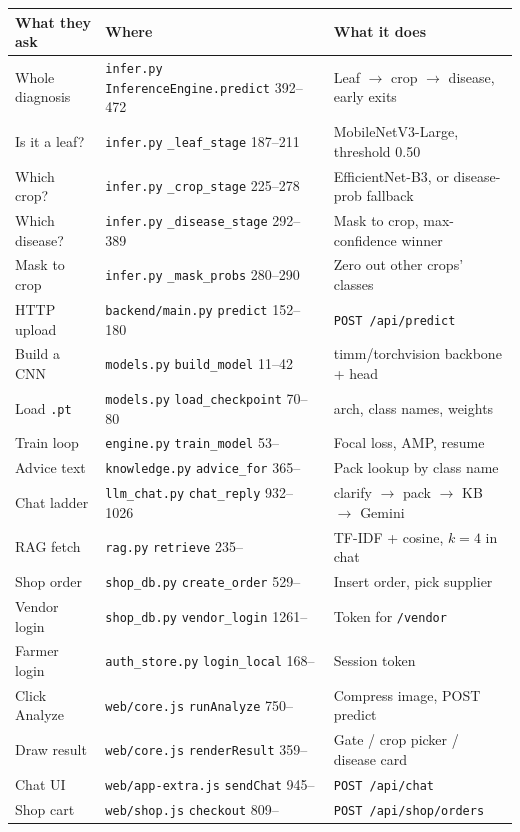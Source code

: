 \documentclass[Times,11pt,oneside,openany]{report}
\begin{document}
\begin{center}
\small
\begin{tabularx}{\textwidth}{@{}p{4.1cm}p{3.3cm}X@{}}
\toprule
\textbf{What they ask} & \textbf{Where} & \textbf{What it does} \\
\midrule
Whole diagnosis & \texttt{infer.py} \texttt{InferenceEngine.predict} 392--472 & Leaf $\rightarrow$ crop $\rightarrow$ disease, early exits \\
Is it a leaf? & \texttt{infer.py} \texttt{\_leaf\_stage} 187--211 & MobileNetV3-Large, threshold 0.50 \\
Which crop? & \texttt{infer.py} \texttt{\_crop\_stage} 225--278 & EfficientNet-B3, or disease-prob fallback \\
Which disease? & \texttt{infer.py} \texttt{\_disease\_stage} 292--389 & Mask to crop, max-confidence winner \\
Mask to crop & \texttt{infer.py} \texttt{\_mask\_probs} 280--290 & Zero out other crops' classes \\
HTTP upload & \texttt{backend/main.py} \texttt{predict} 152--180 & \texttt{POST /api/predict} \\
Build a CNN & \texttt{models.py} \texttt{build\_model} 11--42 & timm/torchvision backbone + head \\
Load \texttt{.pt} & \texttt{models.py} \texttt{load\_checkpoint} 70--80 & arch, class names, weights \\
Train loop & \texttt{engine.py} \texttt{train\_model} 53-- & Focal loss, AMP, resume \\
Advice text & \texttt{knowledge.py} \texttt{advice\_for} 365-- & Pack lookup by class name \\
Chat ladder & \texttt{llm\_chat.py} \texttt{chat\_reply} 932--1026 & clarify $\rightarrow$ pack $\rightarrow$ KB $\rightarrow$ Gemini \\
RAG fetch & \texttt{rag.py} \texttt{retrieve} 235-- & TF-IDF + cosine, $k=4$ in chat \\
Shop order & \texttt{shop\_db.py} \texttt{create\_order} 529-- & Insert order, pick supplier \\
Vendor login & \texttt{shop\_db.py} \texttt{vendor\_login} 1261-- & Token for \texttt{/vendor} \\
Farmer login & \texttt{auth\_store.py} \texttt{login\_local} 168-- & Session token \\
Click Analyze & \texttt{web/core.js} \texttt{runAnalyze} 750-- & Compress image, POST predict \\
Draw result & \texttt{web/core.js} \texttt{renderResult} 359-- & Gate / crop picker / disease card \\
Chat UI & \texttt{web/app-extra.js} \texttt{sendChat} 945-- & \texttt{POST /api/chat} \\
Shop cart & \texttt{web/shop.js} \texttt{checkout} 809-- & \texttt{POST /api/shop/orders} \\
\bottomrule
\end{tabularx}
\end{center}
\end{document}
